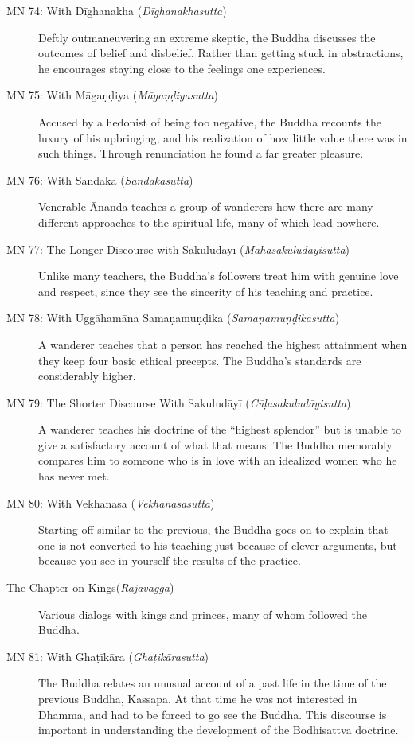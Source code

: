 \documentclass[12pt,openany]{book}%
\begin{document}
\begin{description}
\item[MN 74: With \textsanskrit{Dīghanakha} (\textit{\textsanskrit{Dīghanakhasutta}})] Deftly outmaneuvering an extreme skeptic, the Buddha discusses the outcomes of belief and disbelief. Rather than getting stuck in abstractions, he encourages staying close to the feelings one experiences.%
\item[MN 75: With \textsanskrit{Māgaṇḍiya} (\textit{\textsanskrit{Māgaṇḍiyasutta}})] Accused by a hedonist of being too negative, the Buddha recounts the luxury of his upbringing, and his realization of how little value there was in such things. Through renunciation he found a far greater pleasure.%
\item[MN 76: With Sandaka (\textit{\textsanskrit{Sandakasutta}})] Venerable Ānanda teaches a group of wanderers how there are many different approaches to the spiritual life, many of which lead nowhere.%
\item[MN 77: The Longer Discourse with \textsanskrit{Sakuludāyī} (\textit{\textsanskrit{Mahāsakuludāyisutta}})] Unlike many teachers, the Buddha’s followers treat him with genuine love and respect, since they see the sincerity of his teaching and practice.%
\item[MN 78: With \textsanskrit{Uggāhamāna} \textsanskrit{Samaṇamuṇḍika} (\textit{\textsanskrit{Samaṇamuṇḍikasutta}})] A wanderer teaches that a person has reached the highest attainment when they keep four basic ethical precepts. The Buddha’s standards are considerably higher.%
\item[MN 79: The Shorter Discourse With \textsanskrit{Sakuludāyī} (\textit{\textsanskrit{Cūḷasakuludāyisutta}})] A wanderer teaches his doctrine of the “highest splendor” but is unable to give a satisfactory account of what that means. The Buddha memorably compares him to someone who is in love with an idealized women who he has never met.%
\item[MN 80: With Vekhanasa (\textit{\textsanskrit{Vekhanasasutta}})] Starting off similar to the previous, the Buddha goes on to explain that one is not converted to his teaching just because of clever arguments, but because you see in yourself the results of the practice.%
\item[The Chapter on Kings(\textit{\textsanskrit{Rājavagga}})] Various dialogs with kings and princes, many of whom followed the Buddha.%
\item[MN 81: With \textsanskrit{Ghaṭīkāra} (\textit{\textsanskrit{Ghaṭikārasutta}})] The Buddha relates an unusual account of a past life in the time of the previous Buddha, Kassapa. At that time he was not interested in Dhamma, and had to be forced to go see the Buddha. This discourse is important in understanding the development of the Bodhisattva doctrine.%

\end{description}
\end{document}
